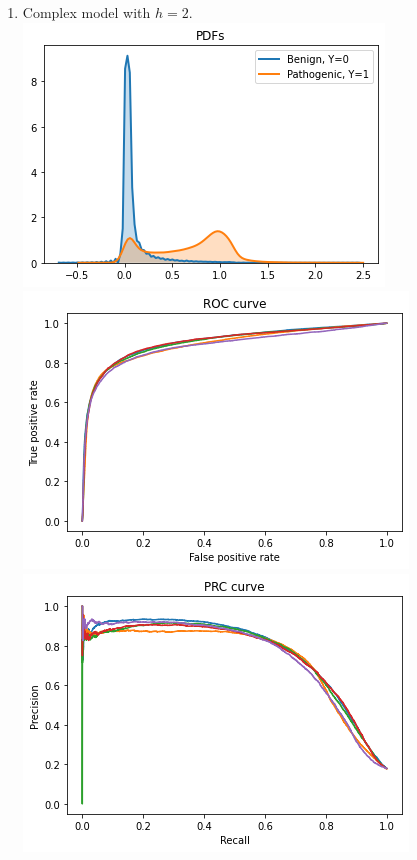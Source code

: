 \documentclass[twoside]{article}
\begin{document}
\begin{enumerate}
		\item Complex model with $h = 2$.\\
		\includegraphics[scale=0.7]{res/img/c2pdf.png}\\
		\includegraphics[scale=0.7]{res/img/c2roc.png}\\
		\includegraphics[scale=0.7]{res/img/c2prc.png}\\
		

\end{enumerate}
\end{document}
